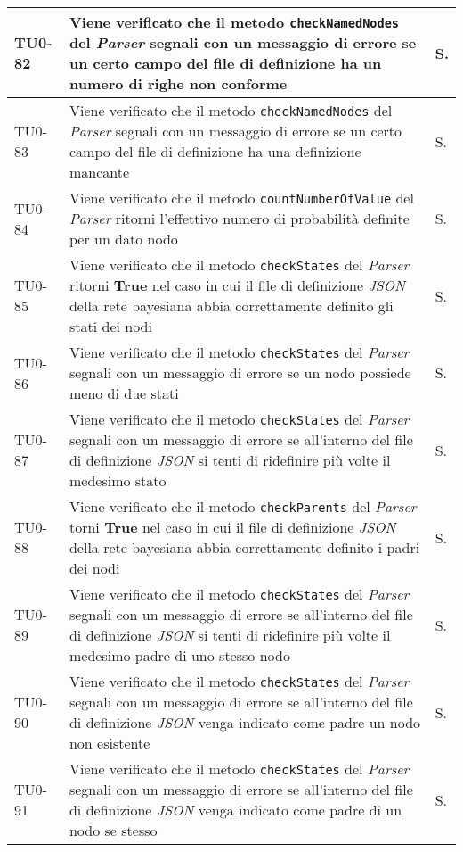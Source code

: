 \begin{longtable}{|C{.15\textwidth}|m{.66\textwidth}|C{.10\textwidth}|}
\hline
TU0-82 & Viene verificato che il metodo \texttt{checkNamedNodes} del \textit{Parser} segnali con un messaggio di errore se un certo campo del file di definizione ha un numero di righe non conforme & S.\\
\hline
{}TU0-83 & Viene verificato che il metodo \texttt{checkNamedNodes} del \textit{Parser} segnali con un messaggio di errore se un certo campo del file di definizione ha una definizione mancante & S.\\
\hline
TU0-84 & Viene verificato che il metodo \texttt{countNumberOfValue} del \textit{Parser} ritorni l'effettivo numero di probabilità definite per un dato nodo & S.\\
\hline
{}TU0-85 & Viene verificato che il metodo \texttt{checkStates} del \textit{Parser} ritorni \textbf{True} nel caso in cui il file di definizione \textit{JSON} della rete bayesiana abbia correttamente definito gli stati dei nodi & S.\\
\hline
TU0-86 & Viene verificato che il metodo \texttt{checkStates} del \textit{Parser} segnali con un messaggio di errore se un nodo possiede meno di due stati & S.\\
\hline
{}TU0-87 & Viene verificato che il metodo \texttt{checkStates} del \textit{Parser} segnali con un messaggio di errore se all'interno del file di definizione \textit{JSON} si tenti di ridefinire più volte il medesimo stato & S.\\
\hline
TU0-88 & Viene verificato che il metodo \texttt{checkParents} del \textit{Parser} torni \textbf{True} nel caso in cui il file di definizione \textit{JSON} della rete bayesiana abbia correttamente definito i padri dei nodi & S.\\
\hline
{}TU0-89 & Viene verificato che il metodo \texttt{checkStates} del \textit{Parser} segnali con un messaggio di errore se all'interno del file di definizione \textit{JSON} si tenti di ridefinire più volte il medesimo padre di uno stesso nodo & S.\\
\hline
TU0-90 & Viene verificato che il metodo \texttt{checkStates} del \textit{Parser} segnali con un messaggio di errore se all'interno del file di definizione \textit{JSON} venga indicato come padre un nodo non esistente & S.\\
\hline
{}TU0-91 & Viene verificato che il metodo \texttt{checkStates} del \textit{Parser} segnali con un messaggio di errore se all'interno del file di definizione \textit{JSON} venga indicato come padre di un nodo se stesso & S.\\

\end{longtable}
